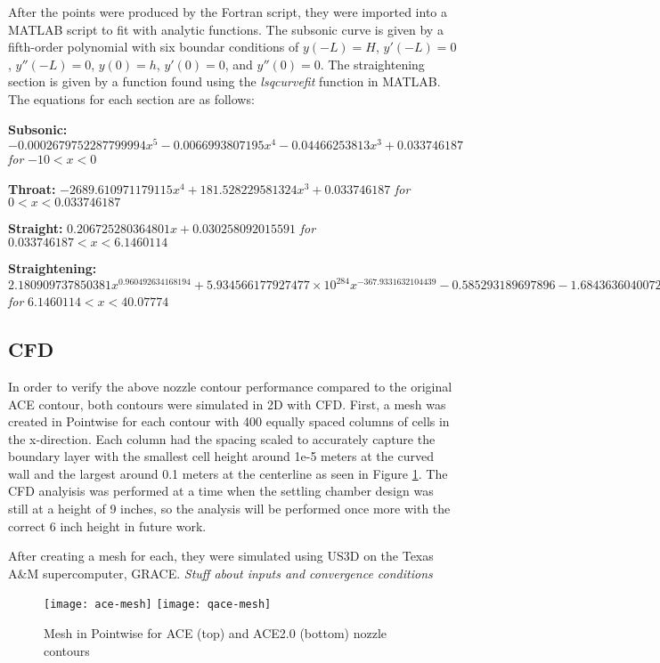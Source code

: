 After the points were produced by the Fortran script, they were imported into a MATLAB script to fit with analytic functions. The subsonic curve is given by a fifth-order polynomial with six boundar conditions of $y(-L)=H$, $y'(-L)=0$, $y''(-L)=0$, $y(0)=h$, $y'(0)=0$, and $y''(0)=0$. The straightening section is given by a function found using the \textit{lsqcurvefit} function in MATLAB. The equations for each section are as follows:

\textbf{Subsonic:} $-0.0002679752287799994x^5 - 0.0066993807195x^4 - 0.04466253813x^3 + 0.033746187$ \textit{for} $-10 < x < 0$

\textbf{Throat:} $-2689.610971179115x^4 + 181.528229581324x^3 + 0.033746187$ \textit{for} $0 < x < 0.033746187$

\textbf{Straight:} $0.206725280364801x + 0.030258092015591$ \textit{for} $0.033746187 < x < 6.1460114$

\textbf{Straightening:} $2.180909737850381x^{0.960492634168194} + 5.934566177927477 \times 10^{284} x^{-367.9331632104439} - 0.585293189697896 - 1.684363604007221x^{1.011336503949665} - 0.023814395465567 \ln(0.418646933043039x)$ \textit{for} $6.1460114 < x < 40.07774$

\subsection{CFD}

In order to verify the above nozzle contour performance compared to the original ACE contour, both contours were simulated in 2D with CFD. First, a mesh was created in Pointwise for each contour with 400 equally spaced columns of cells in the x-direction. Each column had the spacing scaled to accurately capture the boundary layer with the smallest cell height around 1e-5 meters at the curved wall and the largest around 0.1 meters at the centerline as seen in Figure \ref{fig:mesh}. The CFD analyisis was performed at a time when the settling chamber design was still at a height of 9 inches, so the analysis will be performed once more with the correct 6 inch height in future work.

After creating a mesh for each, they were simulated using US3D on the Texas A\&M supercomputer, GRACE. \textit{Stuff about inputs and convergence conditions}

\begin{figure}[ht!]
    \centering
    \texttt{[image: ace-mesh]}
    \texttt{[image: qace-mesh]}
    \caption{Mesh in Pointwise for ACE (top) and ACE2.0 (bottom) nozzle contours}
    \label{fig:mesh}
\end{figure}

